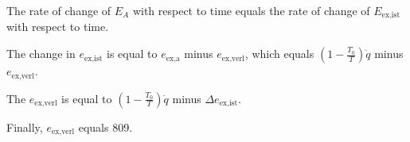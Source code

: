 The rate of change of \( E_A \) with respect to time equals the rate of change of \( E_{\text{ex,ist}} \) with respect to time.

The change in \( e_{\text{ex,ist}} \) is equal to \( e_{\text{ex,a}} \) minus \( e_{\text{ex,verl}} \), which equals \( \left( 1 - \frac{T_0}{T} \right) \dot{q} \) minus \( e_{\text{ex,verl}} \).

The \( e_{\text{ex,verl}} \) is equal to \( \left( 1 - \frac{T_0}{T} \right) \dot{q} \) minus \( \Delta e_{\text{ex,ist}} \).

Finally, \( e_{\text{ex,verl}} \) equals 809.